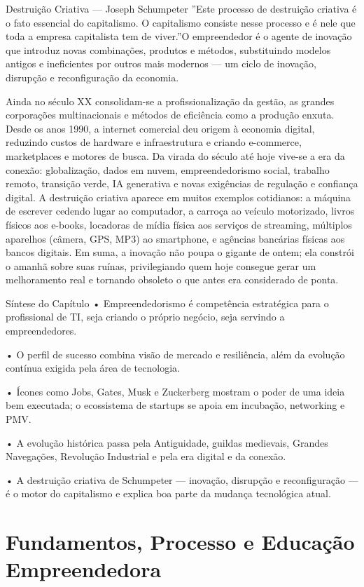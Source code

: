 Destruição Criativa — Joseph Schumpeter ”Este processo de destruição criativa é o fato essencial do capitalismo. O capitalismo consiste nesse processo e é nele que toda a empresa capitalista tem de viver.”O empreendedor é o agente de inovação que introduz novas combinações, produtos e métodos, substituindo modelos antigos e ineficientes por outros mais modernos — um ciclo de inovação, disrupção e reconfiguração da economia.

Ainda no século XX consolidam-se a profissionalização da gestão, as grandes corporações multinacionais e métodos de eficiência como a produção enxuta. Desde os anos 1990, a internet comercial deu origem à economia digital, reduzindo custos de hardware e infraestrutura e criando e-commerce, marketplaces e motores de busca. Da virada do século até hoje vive-se a era da conexão: globalização, dados em nuvem, empreendedorismo social, trabalho remoto, transição verde, IA generativa e novas exigências de regulação e confiança digital. A destruição criativa aparece em muitos exemplos cotidianos: a máquina de escrever cedendo lugar ao computador, a carroça ao veículo motorizado, livros físicos aos e-books, locadoras de mídia física aos serviços de streaming, múltiplos aparelhos (câmera, GPS, MP3) ao smartphone, e agências bancárias físicas aos bancos digitais. Em suma, a inovação não poupa o gigante de ontem; ela constrói o amanhã sobre suas ruínas, privilegiando quem hoje consegue gerar um melhoramento real e tornando obsoleto o que antes era considerado de ponta.

Síntese do Capítulo • Empreendedorismo é competência estratégica para o profissional de TI, seja criando o próprio negócio, seja servindo a empreendedores.

• O perfil de sucesso combina visão de mercado e resiliência, além da evolução contínua exigida pela área de tecnologia.

• Ícones como Jobs, Gates, Musk e Zuckerberg mostram o poder de uma ideia bem executada; o ecossistema de startups se apoia em incubação, networking e PMV.

• A evolução histórica passa pela Antiguidade, guildas medievais, Grandes Navegações, Revolução Industrial e pela era digital e da conexão.

• A destruição criativa de Schumpeter — inovação, disrupção e reconfiguração — é o motor do capitalismo e explica boa parte da mudança tecnológica atual.

\chapter{Fundamentos, Processo e Educação Empreendedora}

